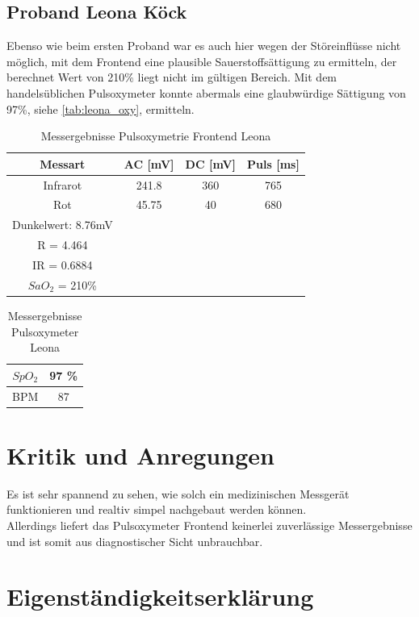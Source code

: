 \documentclass[11pt]{scrartcl}
\begin{document}
    \subsection{Proband Leona Köck}
    Ebenso wie beim ersten Proband war es auch hier wegen der Störeinflüsse nicht möglich, mit dem Frontend eine
    plausible Sauerstoffsättigung zu ermitteln, der berechnet Wert von 210\% liegt nicht im gültigen Bereich.
    Mit dem handelsüblichen Pulsoxymeter konnte abermals eine glaubwürdige Sättigung von 97\%, siehe
    \autoref{tab:leona_oxy}, ermitteln.

    \begin {table} [h]
    \centering
    \caption{Messergebnisse Pulsoxymetrie Frontend Leona}
    \label{tab:leona_frontend}
    \begin{tabular}{c|c c c}
        Messart & AC [mV] & DC [mV] & Puls [ms] \\
        \hline
        Infrarot & 241.8 & 360 & 765 \\
        Rot & 45.75 & 40 & 680 \\
        \hline
        Dunkelwert: 8.76mV \\
        R = 4.464  \\
        IR = 0.6884\\
        $SaO_{2}$ = 210\%
    \end{tabular}  
    \end{table}

    \begin {table} [h]
    \centering
    \caption{Messergebnisse Pulsoxymeter Leona}
    \label{tab:leona_oxy}
    \begin{tabular}{c|c}
        $SpO_2$ & 97 \%  \\
        \hline
        BPM & 87 
    \end{tabular}  
    \end{table}

    \section{Kritik und Anregungen}
	Es ist sehr spannend zu sehen, wie solch ein medizinischen Messgerät funktionieren und realtiv simpel nachgebaut
    werden können.\\
    Allerdings liefert das Pulsoxymeter Frontend keinerlei zuverlässige Messergebnisse und ist somit aus
    diagnostischer Sicht unbrauchbar.
    \pagebreak

    \section*{Eigenständigkeitserklärung}
\end{document}
